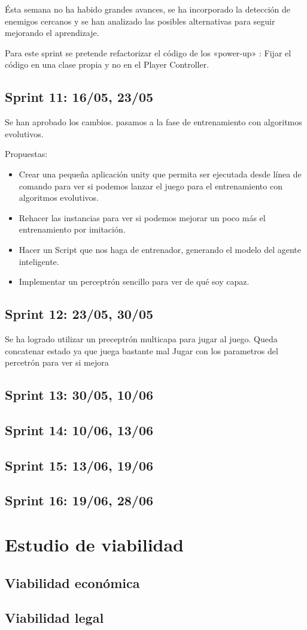 Ésta semana no ha habido grandes avances, se ha incorporado la detección de enemigos cercanos y se han analizado las posibles alternativas para seguir mejorando el aprendizaje.

Para este sprint se pretende refactorizar el código de los «power-up» : Fijar el código en una clase propia y no en el Player Controller.


\subsection{Sprint 11:  16/05, 23/05}

Se han aprobado los cambios. pasamos a la fase de entrenamiento con algoritmos evolutivos.

Propuestas:
\begin{itemize}
    \item Crear una pequeña aplicación unity que permita ser ejecutada desde línea de comando para ver si podemos lanzar el juego para el entrenamiento con algoritmos evolutivos.
    \item Rehacer las instancias para ver si podemos mejorar un poco más el entrenamiento por imitación.
    \item Hacer un Script que nos haga de entrenador, generando el modelo del agente inteligente.
    \item Implementar un perceptrón sencillo para ver de qué soy capaz.
\end{itemize} 

\subsection{Sprint 12:  23/05, 30/05}

Se ha logrado utilizar un preceptrón multicapa para jugar al juego. Queda concatenar estado ya que juega bastante mal Jugar con los parametros del percetrón para ver si mejora


\subsection{Sprint 13:  30/05, 10/06}

\subsection{Sprint 14:  10/06, 13/06}

\subsection{Sprint 15:  13/06, 19/06}

\subsection{Sprint 16:  19/06, 28/06}

\section{Estudio de viabilidad}

\subsection{Viabilidad económica}

\subsection{Viabilidad legal}


